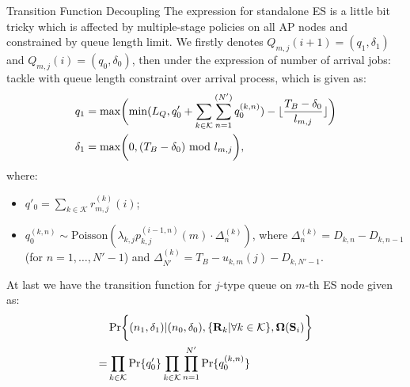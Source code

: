 \documentclass[10pt, conference, letterpaper]{IEEEtran}
\newcommand{\mat}{\mathbf}
\newcommand{\Poisson}{\text{Poisson}}
\DeclarePairedDelimiter{\set}{\{}{\}}
\DeclarePairedDelimiter{\Paren}{\bigg(}{\bigg)}
\DeclarePairedDelimiter{\Brace}{\bigg\{}{\bigg\}}
\newcommand{\apSet}{\mathcal{K}}
\newcommand{\Stat}{\mathbf{S}}
\newcommand{\Policy}{\boldsymbol{\Omega}}
\newcommand{\BPolicy}{\Policy} %
\begin{document}
\begin{section}{Transition Function Decoupling}
        The expression for standalone ES is a little bit tricky which is affected by multiple-stage policies on all AP nodes and constrained by queue length limit.
        We firstly denotes $Q_{m,j}(i+1)=(q_1,\delta_1)$ and $Q_{m,j}(i)=(q_0,\delta_0)$, then under the expression of number of arrival jobs:
        tackle with queue length constraint over arrival process, which is given as:
        \begin{align*}
            q_1 &= \max\Paren{
                \min(L_Q, q'_0 + \sum_{k\in\apSet}\sum_{n=1}^{(N')}q_0^{(k,n)}) - \lfloor{\frac{T_B-\delta_0}{l_{m,j}}}\rfloor
            }
            \\
            \delta_1 &= \max\Paren{
                0, (T_B-\delta_0) \text{ mod } l_{m,j}
            },
        \end{align*}
        where:
        \begin{itemize}
            \item $q'_0 = \sum_{k\in\apSet}r^{(k)}_{m,j}(i)$;
            \item $q_0^{(k,n)} \sim \Poisson(\lambda_{k,j}p^{(i-1,n)}_{k,j}(m) \cdot \Delta^{(k)}_{n})$, where $\Delta^{(k)}_{n}=D_{k,n} - D_{k,n-1}$ (for $n=1,\dots,N'-1$) and $\Delta^{(k)}_{N'} = T_B-u_{k,m}(j)-D_{k,N'-1}$.
        \end{itemize}
        At last we have the transition function for $j$-type queue on $m$-th ES node given as:
        \begin{align*}
            & \Pr\Brace{(n_1,\delta_1)|(n_0,\delta_0), \set{\mat{R}_{k}|\forall k\in\apSet}, \BPolicy(\Stat_i)}
            \nonumber\\
            =& \prod_{k\in\apSet} \Pr\{q'_0\} \prod_{k\in\apSet}\prod_{n=1}^{N'} \Pr\{q_0^{(k,n)}\}
        \end{align*}
    \end{section}
    
    
    
\end{document}
